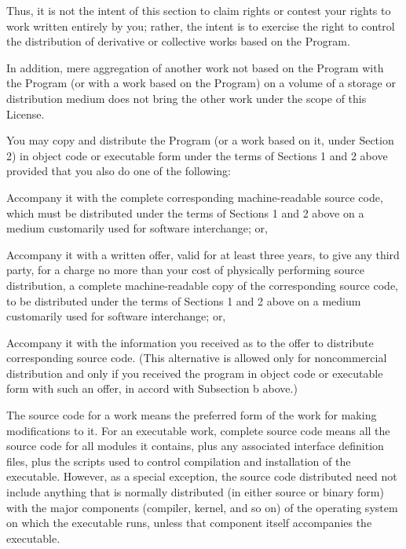 \begin{lrbox}{\gpl}
\begin{minipage}{3\textwidth}
      Thus, it is not the intent of this section to claim rights or
      contest your rights to work written entirely by you; rather, the
      intent is to exercise the right to control the distribution of
      derivative or collective works based on the Program.

      In addition, mere aggregation of another work not based on the
      Program with the Program (or with a work based on the Program) on
      a volume of a storage or distribution medium does not bring the
      other work under the scope of this License.

\item You may copy and distribute the Program (or a work based on it,
      under Section 2) in object code or executable form under the
      terms of Sections 1 and 2 above provided that you also do one of
      the following:

      \beginenumeration

      \item Accompany it with the complete corresponding machine-readable
            source code, which must be distributed under the terms of
            Sections 1 and 2 above on a medium customarily used for software
            interchange; or,

      \item Accompany it with a written offer, valid for at least three
            years, to give any third party, for a charge no more than your
            cost of physically performing source distribution, a complete
            machine-readable copy of the corresponding source code, to be
            distributed under the terms of Sections 1 and 2 above on a medium
            customarily used for software interchange; or,

      \item Accompany it with the information you received as to the offer
            to distribute corresponding source code.  (This alternative is
            allowed only for noncommercial distribution and only if you
            received the program in object code or executable form with such
            an offer, in accord with Subsection b above.)

      \endenumeration


      The source code for a work means the preferred form of the work
      for making modifications to it.  For an executable work, complete
      source code means all the source code for all modules it
      contains, plus any associated interface definition files, plus
      the scripts used to control compilation and installation of the
      executable.  However, as a special exception, the source code
      distributed need not include anything that is normally
      distributed (in either source or binary form) with the major
      components (compiler, kernel, and so on) of the operating system
      on which the executable runs, unless that component itself
      accompanies the executable.


\end{minipage}
\end{lrbox}
